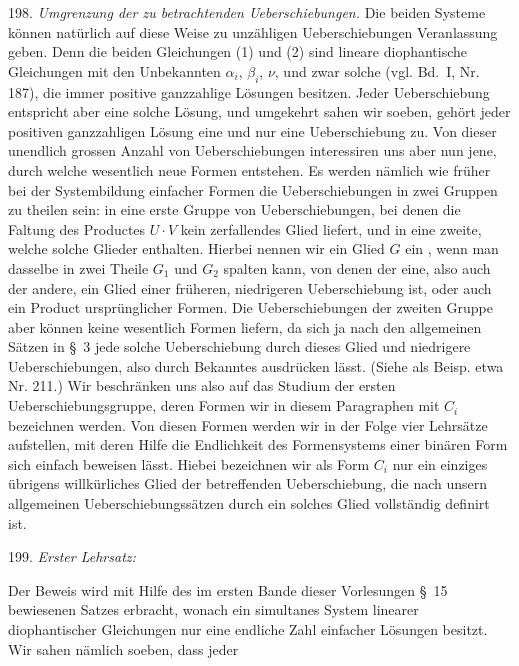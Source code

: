 198. \textit{Umgrenzung der zu betrachtenden Ueberschiebungen.} Die beiden Systeme k\"onnen nat\"urlich auf diese Weise zu unz\"ahligen Ueberschiebungen Veranlassung geben. Denn die beiden Gleichungen (1) und (2) sind lineare diophantische Gleichungen mit den Unbekannten $\alpha_i$, $\beta_i$, $\nu$, und zwar solche (vgl. Bd.\ I, Nr. 187), die immer positive ganzzahlige L\"osungen besitzen. Jeder Ueberschiebung entspricht aber eine solche L\"osung, und umgekehrt sahen wir soeben, geh\"ort jeder positiven ganzzahligen L\"osung eine und nur eine Ueberschiebung zu. Von dieser unendlich grossen Anzahl von Ueberschiebungen interessiren uns aber nun jene, durch welche wesentlich neue Formen entstehen. Es werden n\"amlich wie fr\"uher bei der Systembildung einfacher Formen die Ueberschiebungen in zwei Gruppen zu theilen sein: in eine erste Gruppe von Ueberschiebungen, bei denen die Faltung des Productes $U \cdot V$ kein zerfallendes Glied liefert, und in eine zweite, welche solche Glieder enthalten. Hierbei nennen wir ein Glied $G$ ein , wenn man dasselbe in zwei Theile $G_1$ und $G_2$ spalten kann, von denen der eine, also auch der andere, ein Glied einer fr\"uheren, niedrigeren Ueberschiebung ist, oder auch ein Product urspr\"unglicher Formen. Die Ueberschiebungen der zweiten Gruppe aber k\"onnen keine wesentlich  Formen liefern, da sich ja nach den allgemeinen S\"atzen in \S~3 jede solche Ueberschiebung durch dieses Glied und niedrigere Ueberschiebungen, also durch Bekanntes ausdr\"ucken l\"asst. (Siehe als Beisp. etwa Nr. 211.) Wir beschr\"anken uns also auf das Studium der ersten Ueberschiebungsgruppe, deren Formen wir in diesem Paragraphen mit $C_i$ bezeichnen werden. Von diesen Formen werden wir in der Folge vier Lehrs\"atze aufstellen, mit deren Hilfe die Endlichkeit des Formensystems einer bin\"aren Form sich einfach beweisen l\"asst. Hiebei bezeichnen wir als Form $C_i$ nur ein einziges \"ubrigens willk\"urliches Glied der betreffenden Ueberschiebung, die nach unsern allgemeinen Ueberschiebungss\"atzen durch ein solches Glied vollst\"andig definirt ist.

199. \textit{Erster Lehrsatz:} 

Der Beweis wird mit Hilfe des im ersten Bande dieser Vorlesungen \S~15 bewiesenen Satzes erbracht, wonach ein simultanes System linearer diophantischer Gleichungen nur eine endliche Zahl einfacher L\"osungen besitzt. Wir sahen n\"amlich soeben, dass jeder


